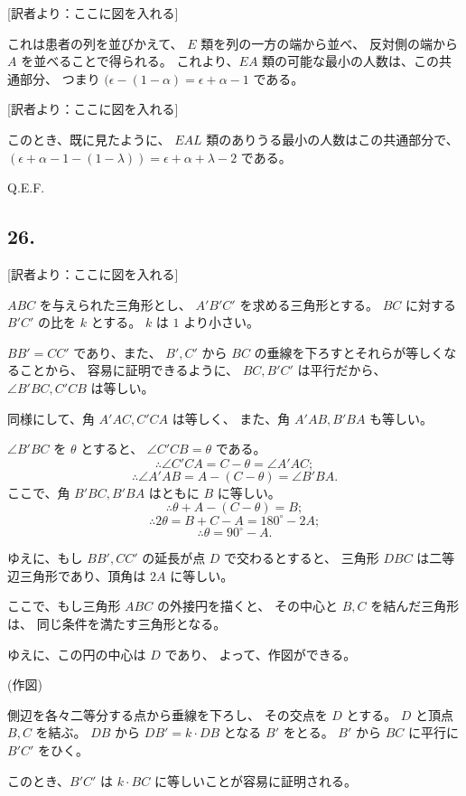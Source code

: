 [訳者より：ここに図を入れる]

これは患者の列を並びかえて、
$E$ 類を列の一方の端から並べ、
反対側の端から $A$ を並べることで得られる。
これより、$EA$ 類の可能な最小の人数は、この共通部分、
つまり $(\epsilon - (1 - \alpha) = \epsilon + \alpha - 1$ である。

[訳者より：ここに図を入れる]

このとき、既に見たように、
$EAL$ 類のありうる最小の人数はこの共通部分で、
$(\epsilon + \alpha - 1 - (1 - \lambda)) = \epsilon + \alpha + \lambda - 2$
である。

Q.E.F.

\subsection*{26.}

[訳者より：ここに図を入れる]

$ABC$ を与えられた三角形とし、
$A'B'C'$ を求める三角形とする。
$BC$ に対する $B'C'$ の比を $k$ とする。
$k$ は $1$ より小さい。

$BB' = CC'$ であり、また、
$B', C'$ から $BC$ の垂線を下ろすとそれらが等しくなることから、
容易に証明できるように、
$BC, B'C'$ は平行だから、
$\angle B'BC, C'CB$ は等しい。

同様にして、角 $A'AC, C'CA$ は等しく、
また、角 $A'AB, B'BA$ も等しい。

$\angle B'BC$ を $\theta$ とすると、
$\angle C'CB = \theta$ である。
\[
\therefore
\angle C'CA = C - \theta = \angle A'AC;
\]
\[
\therefore
\angle A'AB = A - (C - \theta) = \angle B'BA.
\]
ここで、角 $B'BC, B'BA$ はともに $B$ に等しい。
\[
\therefore
\theta + A - (C - \theta) = B;
\]
\[
\therefore
2 \theta = B + C - A = 180^\circ - 2A;
\]
\[
\therefore
\theta = 90^\circ - A.
\]

ゆえに、もし $BB', CC'$ の延長が点 $D$ で交わるとすると、
三角形 $DBC$ は二等辺三角形であり、頂角は $2A$ に等しい。

ここで、もし三角形 $ABC$ の外接円を描くと、
その中心と $B, C$ を結んだ三角形は、
同じ条件を満たす三角形となる。

ゆえに、この円の中心は $D$ であり、
よって、作図ができる。

(作図)

側辺を各々二等分する点から垂線を下ろし、
その交点を $D$ とする。
$D$ と頂点 $B, C$ を結ぶ。
$DB$ から $DB' = k \cdot DB$ となる $B'$ をとる。
$B'$ から $BC$ に平行に $B'C'$ をひく。

このとき、$B'C'$ は $k \cdot BC$ に等しいことが容易に証明される。

